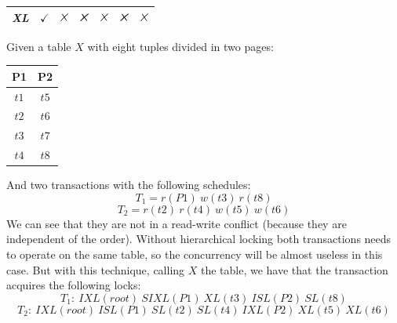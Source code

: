\begin{itemize}
\begin{table}[H]
\begin{tabular}{ccccccc}
        \multicolumn{1}{|c|}{\textit{XL}}     & \multicolumn{1}{c|}{$\checkmark$}  & \multicolumn{1}{c|}{$\tikzxmark$} & \multicolumn{1}{c|}{$\tikzxmark$} & \multicolumn{1}{c|}{$\tikzxmark$} & \multicolumn{1}{c|}{$\tikzxmark$}  & \multicolumn{1}{c|}{$\tikzxmark$} \\ \hline
        \end{tabular}
    \end{table}
    \begin{example}
        Given a table $X$ with eight tuples divided in two pages: 
        \begin{table}[H]
            \centering
            \begin{tabular}{cc}
            \textbf{P1}                 & \textbf{P2}               \\ \hline
            \multicolumn{1}{|c|}{$t1$}  & \multicolumn{1}{c|}{$t5$} \\ \hline
            \multicolumn{1}{|c|}{$t2$}  & \multicolumn{1}{c|}{$t6$} \\ \hline
            \multicolumn{1}{|c|}{$t3$}  & \multicolumn{1}{c|}{$t7$} \\ \hline
            \multicolumn{1}{|c|}{$t4$}  & \multicolumn{1}{c|}{$t8$} \\ \hline
            \end{tabular}
        \end{table}
        And two transactions with the following schedules: 
        \[T_1=r(P1)\:w(t3)\:r(t8)\]
        \[T_2=r(t2)\:r(t4)\:w(t5)\:w(t6)\]
        We can see that they are not in a read-write conflict (because they are independent of the order). 
        Without hierarchical locking both transactions needs to operate on the same table, so the concurrency will be almost useless in this case. 
        But with this technique, calling $X$ the table, we have that the transaction acquires the following locks: 
        \[T_1:\:IXL(root)\:SIXL(P1)\:XL(t3)\:ISL(P2)\:SL(t8)\]
        \[T_2:\:IXL(root)\:ISL(P1)\:SL(t2)\:SL(t4)\:IXL(P2)\:XL(t5)\:XL(t6)\]
    \end{example}
\end{itemize}